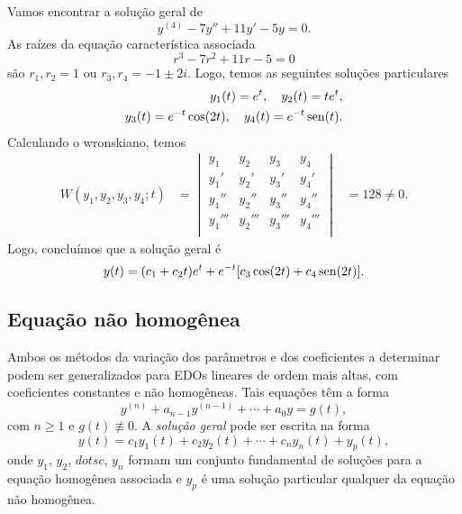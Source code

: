 \begin{ex}
  Vamos encontrar a solução geral de
  \begin{equation}
    y^{(4)} - 7y'' + 11y' - 5y = 0.
  \end{equation}
  As raízes da equação característica associada
  \begin{equation}
    r^3 - 7r^2 + 11r - 5 = 0
  \end{equation}
  são $r_1, r_2 = 1$ ou $r_3, r_4 = -1 \pm 2i$. Logo, temos as seguintes soluções particulares
  \begin{align}
    y_1(t) = e^t,\quad y_2(t) = te^t, \\
    y_3(t) = e^{-t}\cos(2t),\quad y_4(t) = e^{-t}\operatorname{sen}(t).
  \end{align}
  Calculando o wronskiano, temos
  \begin{align}
    W(y_1,y_2,y_3,y_4;t) &=
                           \begin{vmatrix}
                             y_1 & y_2 & y_3 & y_4 \\
                             y_1' & y_2' & y_3' & y_4' \\
                             y_1'' & y_2'' & y_3'' & y_4'' \\
                             y_1''' & y_2''' & y_3''' & y_4''' \\
                           \end{vmatrix}
                         &= 128 \neq 0.
  \end{align}
  Logo, concluímos que a solução geral é
  \begin{equation}
    y(t) = (c_1 + c_2t)e^t + e^{-t}[c_3\cos(2t) + c_4\operatorname{sen}(2t)].
  \end{equation}
\end{ex}

\subsection{Equação não homogênea}

Ambos os métodos da variação dos parâmetros e dos coeficientes a determinar podem ser generalizados para EDOs lineares de ordem mais altas, com coeficientes constantes e não homogêneas. Tais equações têm a forma
\begin{equation}
  y^{(n)} + a_{n-1}y^{(n-1)} + \cdots + a_0y = g(t),
\end{equation}
com $n\geq 1$ e $g(t)\not\equiv 0$. A \emph{solução geral} pode ser escrita na forma
\begin{equation}
  y(t) = c_1y_1(t) + c_2y_2(t) + \cdots + c_ny_n(t) + y_p(t),
\end{equation}
onde $y_1$, $y_2$, $dotsc$, $y_n$ formam um conjunto fundamental de soluções para a equação homogênea associada e $y_p$ é uma solução particular qualquer da equação não homogênea.

